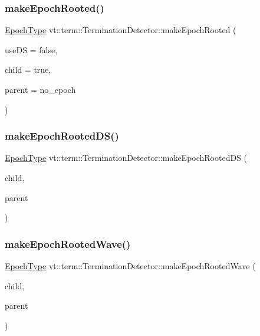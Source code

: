 \subsubsection{\texorpdfstring{make\+Epoch\+Rooted()}{makeEpochRooted()}}
{\footnotesize\ttfamily \hyperlink{namespacevt_a985a5adf291c34a3ca263b3378388236}{Epoch\+Type} vt\+::term\+::\+Termination\+Detector\+::make\+Epoch\+Rooted (\begin{DoxyParamCaption}\item[{bool}]{use\+DS = {\ttfamily false},  }\item[{bool}]{child = {\ttfamily true},  }\item[{\hyperlink{namespacevt_a985a5adf291c34a3ca263b3378388236}{Epoch\+Type}}]{parent = {\ttfamily no\+\_\+epoch} }\end{DoxyParamCaption})}

\mbox{\label{structvt_1_1term_1_1_termination_detector_a80e88dba4ae3462a9c7a4be5c4cebbc1}} 
\subsubsection{\texorpdfstring{make\+Epoch\+Rooted\+D\+S()}{makeEpochRootedDS()}}
{\footnotesize\ttfamily \hyperlink{namespacevt_a985a5adf291c34a3ca263b3378388236}{Epoch\+Type} vt\+::term\+::\+Termination\+Detector\+::make\+Epoch\+Rooted\+DS (\begin{DoxyParamCaption}\item[{bool}]{child,  }\item[{\hyperlink{namespacevt_a985a5adf291c34a3ca263b3378388236}{Epoch\+Type}}]{parent }\end{DoxyParamCaption})}

\mbox{\label{structvt_1_1term_1_1_termination_detector_af3a8e284b580b295dfb3befe7752fdd5}} 
\subsubsection{\texorpdfstring{make\+Epoch\+Rooted\+Wave()}{makeEpochRootedWave()}}
{\footnotesize\ttfamily \hyperlink{namespacevt_a985a5adf291c34a3ca263b3378388236}{Epoch\+Type} vt\+::term\+::\+Termination\+Detector\+::make\+Epoch\+Rooted\+Wave (\begin{DoxyParamCaption}\item[{bool}]{child,  }\item[{\hyperlink{namespacevt_a985a5adf291c34a3ca263b3378388236}{Epoch\+Type}}]{parent }\end{DoxyParamCaption})}

